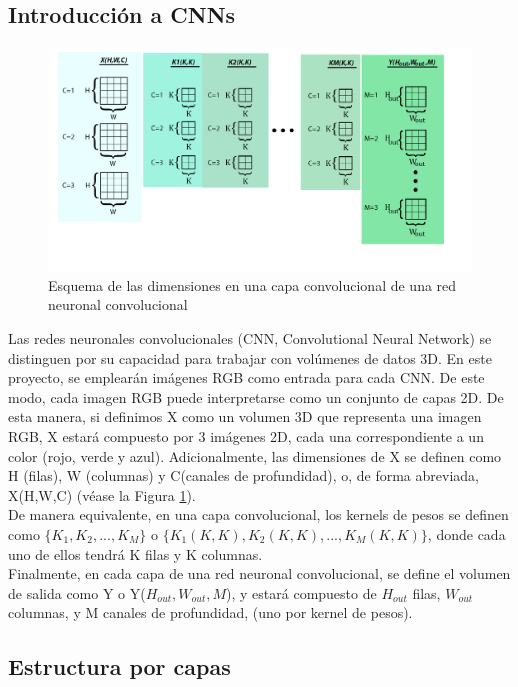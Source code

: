 \subsection{Introducción a CNNs \label{intro_CNN}}

\begin{figure}[H]
	\centering
	\includegraphics[scale=0.2]{imagenes/conv_dims.jpg}  
	\caption{Esquema de las dimensiones en una capa convolucional de una red neuronal convolucional}
	\label{fig:Dimensiones_convolucion}
\end{figure}


Las redes neuronales convolucionales (CNN, Convolutional Neural Network) se distinguen por su capacidad para trabajar con volúmenes de datos 3D. En este proyecto, se emplearán imágenes RGB como entrada para cada CNN. De este modo, cada imagen RGB puede interpretarse como un conjunto de capas 2D. De esta manera, si definimos X como un volumen 3D que representa una imagen RGB, X estará compuesto por 3 imágenes 2D, cada una correspondiente a un color (rojo, verde y azul). 
Adicionalmente, las dimensiones de X se definen como H (filas), W (columnas) y C(canales de profundidad), o, de forma abreviada, X(H,W,C) (véase la Figura \ref{fig:Dimensiones_convolucion}). \\
De manera equivalente, en una capa convolucional, los kernels de pesos se definen como $\{K_1, K_2, ..., K_M\}$ o $\{K_1(K,K), K_2(K,K), ..., K_M(K,K)\}$, donde cada uno de ellos tendrá K filas y K columnas. \\
Finalmente, en cada capa de una red neuronal convolucional, se define el volumen de salida como Y o Y($H_{out}, W_{out}, M$), y estará compuesto de $H_{out}$ filas, $W_{out}$ columnas, y M canales de profundidad, (uno por kernel de pesos).

\subsection{Estructura por capas}

